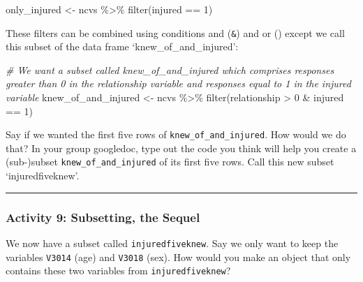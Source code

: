 \documentclass[
]{book}
\newenvironment{Shaded}{\begin{snugshade}}{\end{snugshade}}
\newcommand{\CommentTok}[1]{\textcolor[rgb]{0.56,0.35,0.01}{\textit{#1}}}
\newcommand{\DecValTok}[1]{\textcolor[rgb]{0.00,0.00,0.81}{#1}}
\newcommand{\FunctionTok}[1]{\textcolor[rgb]{0.00,0.00,0.00}{#1}}
\newcommand{\NormalTok}[1]{#1}
\newcommand{\OtherTok}[1]{\textcolor[rgb]{0.56,0.35,0.01}{#1}}
\newcommand{\SpecialCharTok}[1]{\textcolor[rgb]{0.00,0.00,0.00}{#1}}
\begin{document}
\begin{Shaded}
\begin{Highlighting}[]
\NormalTok{only\_injured }\OtherTok{\textless{}{-}}\NormalTok{ ncvs }\SpecialCharTok{\%\textgreater{}\%} \FunctionTok{filter}\NormalTok{(injured }\SpecialCharTok{==} \DecValTok{1}\NormalTok{)}
\end{Highlighting}
\end{Shaded}

These filters can be combined using conditions and (\texttt{\&}) and or (\texttt{\textbar{}}) except we call this subset of the data frame `knew\_of\_and\_injured':

\begin{Shaded}
\begin{Highlighting}[]
\CommentTok{\# We want a subset called \textquotesingle{}knew\_of\_and\_injured\textquotesingle{} which comprises responses greater than 0 in the \textquotesingle{}relationship\textquotesingle{} variable and responses equal to 1 in the \textquotesingle{}injured\textquotesingle{} variable}
\NormalTok{knew\_of\_and\_injured }\OtherTok{\textless{}{-}}\NormalTok{ ncvs }\SpecialCharTok{\%\textgreater{}\%} 
\FunctionTok{filter}\NormalTok{(relationship }\SpecialCharTok{\textgreater{}} \DecValTok{0} \SpecialCharTok{\&}\NormalTok{ injured }\SpecialCharTok{==} \DecValTok{1}\NormalTok{)}
\end{Highlighting}
\end{Shaded}

Say if we wanted the first five rows of \texttt{knew\_of\_and\_injured}. How would we do that? In your group googledoc, type out the code you think will help you create a (sub-)subset \texttt{knew\_of\_and\_injured} of its first five rows. Call this new subset `injuredfiveknew'.

\begin{center}\rule{0.5\linewidth}{0.5pt}\end{center}

\hypertarget{activity-9-subsetting-the-sequel}{%
\subsubsection{Activity 9: Subsetting, the Sequel}\label{activity-9-subsetting-the-sequel}}

We now have a subset called \texttt{injuredfiveknew}. Say we only want to keep the variables \texttt{V3014} (age) and \texttt{V3018} (sex). How would you make an object that only contains these two variables from \texttt{injuredfiveknew}?
\end{document}
